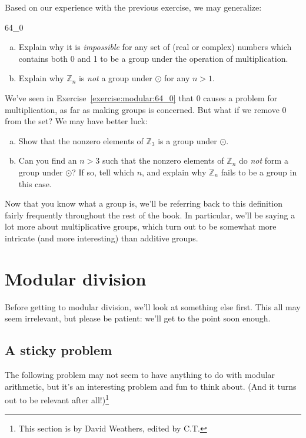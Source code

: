 Based on our experience with the previous exercise, we may generalize:

\begin{exercise}{64_0}
\begin{enumerate}[(a)]
\item
Explain why it is \emph{impossible} for any set of (real or complex) numbers which contains both 0 and 1 to be a group under the operation of multiplication.
\item Explain why $\mathbb{Z}_n$ is \emph{not} a group under $\odot$ for any $n>1$.
\end{enumerate}
\end{exercise}

We've seen in Exercise~\ref{exercise:modular:64_0} that 0 causes a problem for multiplication, as far as making groups is concerned. But what if we remove 0 from the set? We may have better luck: 
 
\begin{exercise}{64}
\begin{enumerate}[(a)]
\item
Show that the nonzero elements of ${\mathbb Z}_3$  is a group under $\odot$.
\item
Can you find an $n>3$ such that the nonzero elements of ${\mathbb Z}_n$ do \emph{not} form a group under $\odot$? If so, tell which $n$, and explain why ${\mathbb Z}_n$ fails to be a group in this case.
\end{enumerate}
\end{exercise}

Now that you know what a group is, we'll be referring back to this definition fairly frequently throughout the rest of the book. In particular, we'll be saying a lot more about multiplicative groups, which turn out to be somewhat more intricate (and more interesting) than additive groups.

 \section{Modular division\quad
{}}\label{euclidean}

 Before getting to modular division, we'll look at something else first. This all may seem irrelevant, but  please be patient: we'll get to the point soon enough.
 
 
\subsection{A sticky problem}
The following problem may not seem to have anything to do with modular arithmetic, but it's an interesting problem and fun to think about. (And it turns out to be relevant after all!)\footnote{This section is by David Weathers, edited by C.T.}

